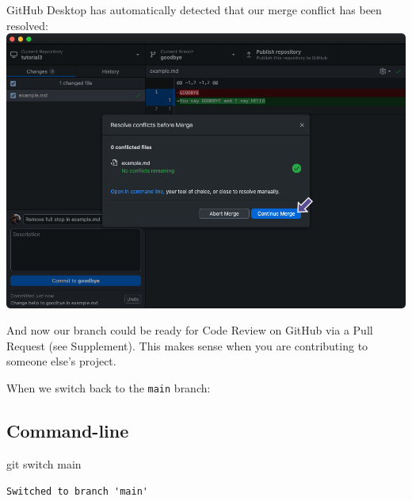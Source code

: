 \documentclass[
  letterpaper,
  DIV=11,
  numbers=noendperiod]{scrartcl}
\newenvironment{Shaded}{\begin{snugshade}}{\end{snugshade}}
\newcommand{\FunctionTok}[1]{\textcolor[rgb]{0.28,0.35,0.67}{#1}}
\newcommand{\NormalTok}[1]{\textcolor[rgb]{0.00,0.23,0.31}{#1}}
\begin{document}
GitHub Desktop has automatically detected that our merge conflict has
been resolved: \includegraphics{images/image68.png}

\begin{tcolorbox}[enhanced jigsaw, rightrule=.15mm, opacitybacktitle=0.6, bottomtitle=1mm, colbacktitle=quarto-callout-note-color!10!white, toprule=.15mm, title=\textcolor{quarto-callout-note-color}{\faInfo}\hspace{0.5em}{Note}, toptitle=1mm, left=2mm, leftrule=.75mm, titlerule=0mm, bottomrule=.15mm, colframe=quarto-callout-note-color-frame, arc=.35mm, coltitle=black, breakable, colback=white, opacityback=0]

And now our branch could be ready for Code Review on GitHub via a Pull
Request (see Supplement). This makes sense when you are contributing to
someone else's project.

\end{tcolorbox}

When we switch back to the \texttt{main} branch:

\subsection{Command-line}

\begin{Shaded}
\begin{Highlighting}[]
\FunctionTok{git}\NormalTok{ switch main}
\end{Highlighting}
\end{Shaded}

\begin{verbatim}
Switched to branch 'main'
\end{verbatim}
\end{document}
